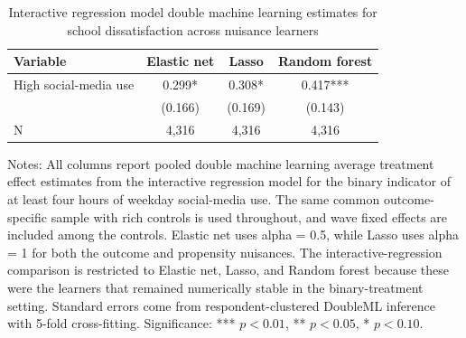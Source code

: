 \begin{table}[!htbp]
\centering
\caption{Interactive regression model double machine learning estimates for school dissatisfaction across nuisance learners}
\label{tab:irm_school_methods}
\begin{tabular}{lccc}
\hline
Variable & Elastic net & Lasso & Random forest
\\
\hline
High social-media use & 0.299* & 0.308* & 0.417***
\\
 & (0.166) & (0.169) & (0.143)
\\
N & 4,316 & 4,316 & 4,316
\\
\hline
\end{tabular}
\begin{minipage}{0.95\textwidth}
\footnotesize Notes: All columns report pooled double machine learning average treatment effect estimates from the interactive regression model for the binary indicator of at least four hours of weekday social-media use. The same common outcome-specific sample with rich controls is used throughout, and wave fixed effects are included among the controls. Elastic net uses alpha = 0.5, while Lasso uses alpha = 1 for both the outcome and propensity nuisances. The interactive-regression comparison is restricted to Elastic net, Lasso, and Random forest because these were the learners that remained numerically stable in the binary-treatment setting. Standard errors come from respondent-clustered DoubleML inference with 5-fold cross-fitting. Significance: *** \(p < 0.01\), ** \(p < 0.05\), * \(p < 0.10\).
\end{minipage}
\end{table}
